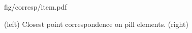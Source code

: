 \begin{figure}[t]
\centering
\begin{overpic} 
[width=\linewidth]
{fig/corresp/item.pdf}
\end{overpic}
\caption{(left) Closest point correspondence on pill elements.  (right)   }
\label{fig:corresp}
\end{figure}